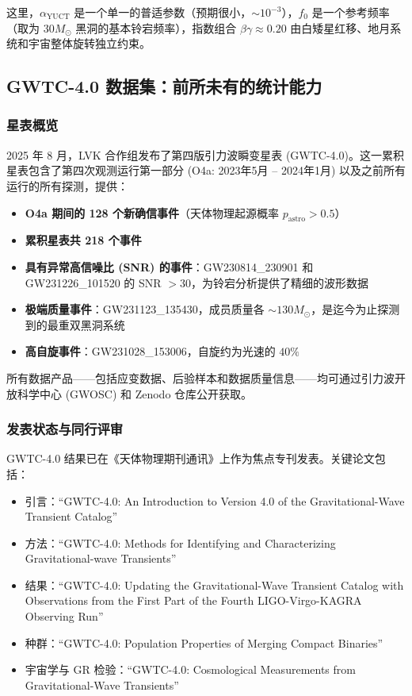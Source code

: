 \documentclass[11pt,a4paper]{article}
\theoremstyle{remark}
\begin{document}
	这里，$\alpha_{\text{YUCT}}$ 是一个单一的普适参数（预期很小，$\sim 10^{-3}$），$f_0$ 是一个参考频率（取为 $30 M_\odot$ 黑洞的基本铃宕频率），指数组合 $\beta\gamma \approx 0.20$ 由白矮星红移、地月系统和宇宙整体旋转独立约束。
	
	\subsection{GWTC-4.0 数据集：前所未有的统计能力}
	
	\subsubsection{星表概览}
	
	2025 年 8 月，LVK 合作组发布了第四版引力波瞬变星表 (GWTC-4.0)。这一累积星表包含了第四次观测运行第一部分 (O4a: 2023年5月 – 2024年1月) 以及之前所有运行的所有探测，提供：
	
	\begin{itemize}
		\item \textbf{O4a 期间的 128 个新确信事件}（天体物理起源概率 $p_{\text{astro}} > 0.5$）
		\item \textbf{累积星表共 218 个事件}
		\item \textbf{具有异常高信噪比 (SNR) 的事件}：GW230814\_230901 和 GW231226\_101520 的 SNR $> 30$，为铃宕分析提供了精细的波形数据
		\item \textbf{极端质量事件}：GW231123\_135430，成员质量各 $\sim 130 M_\odot$，是迄今为止探测到的最重双黑洞系统
		\item \textbf{高自旋事件}：GW231028\_153006，自旋约为光速的 $40\%$
	\end{itemize}
	
	所有数据产品——包括应变数据、后验样本和数据质量信息——均可通过引力波开放科学中心 (GWOSC) 和 Zenodo 仓库公开获取。
	
	\subsubsection{发表状态与同行评审}
	
	GWTC-4.0 结果已在《天体物理期刊通讯》上作为焦点专刊发表。关键论文包括：
	
	\begin{itemize}
		\item 引言：``GWTC-4.0: An Introduction to Version 4.0 of the Gravitational-Wave Transient Catalog''
		\item 方法：``GWTC-4.0: Methods for Identifying and Characterizing Gravitational-wave Transients''
		\item 结果：``GWTC-4.0: Updating the Gravitational-Wave Transient Catalog with Observations from the First Part of the Fourth LIGO-Virgo-KAGRA Observing Run''
		\item 种群：``GWTC-4.0: Population Properties of Merging Compact Binaries''
		\item 宇宙学与 GR 检验：``GWTC-4.0: Cosmological Measurements from Gravitational-Wave Transients''
	\end{itemize}
	
\end{document}
